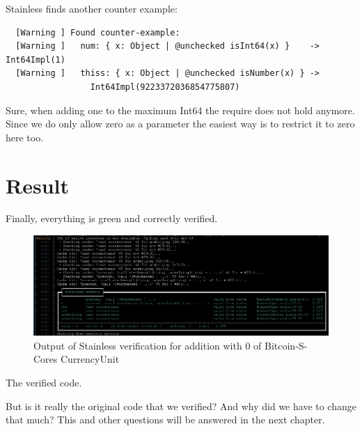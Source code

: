 Stainless finds another counter example:
{\footnotesize\begin{verbatim}
  [Warning ] Found counter-example:
  [Warning ]   num: { x: Object | @unchecked isInt64(x) }    -> Int64Impl(1)
  [Warning ]   thiss: { x: Object | @unchecked isNumber(x) } ->
                 Int64Impl(9223372036854775807)
\end{verbatim}}

Sure, when adding one to the maximum Int64 the require does not hold anymore.
Since we do only allow zero as a parameter the easiest way is to restrict it to zero here too.


\section{Result}

Finally, everything is green and correctly verified.
\begin{figure}[H]
	\centering
		\includegraphics[scale=0.45]{images/final_verify_output.png}
	\caption{Output of Stainless verification for addition with 0 of Bitcoin-S-Cores CurrencyUnit}
	\label{fig:output1}
\end{figure}

The verified code.


But is it really the original code that we verified?
And why did we have to change that much?
This and other questions will be answered in the next chapter.
